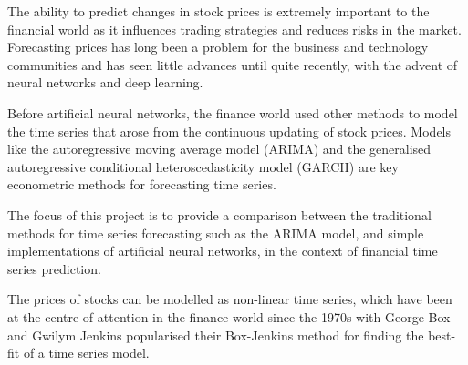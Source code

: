The ability to predict changes in stock prices is extremely important to the financial world as it influences trading strategies and reduces risks in the market. Forecasting prices has long been a problem for the business and technology communities and has seen little advances until quite recently, with the advent of neural networks and deep learning.

Before artificial neural networks, the finance world used other methods to model the time series that arose from the continuous updating of stock prices. Models like the autoregressive moving average model (ARIMA) and the generalised autoregressive conditional heteroscedasticity model (GARCH) are key econometric methods for forecasting time series.

The focus of this project is to provide a comparison between the traditional methods for time series forecasting such as the ARIMA model, and simple implementations of artificial neural networks, in the context of financial time series prediction. 

The prices of stocks can be modelled as non-linear time series, which have been at the centre of attention in the finance world since the 1970s with George Box and Gwilym Jenkins popularised their Box-Jenkins method for finding the best-fit of a time series model\cite{box_jenkins}.

